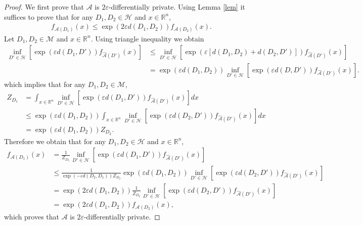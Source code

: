 \documentclass[12pt,a4paper]{article}
\numberwithin{equation}{section}
\numberwithin{equation}{section}
\renewcommand{\epsilon}{\varepsilon}
\newcommand{\1}{{\text{\Large $\mathfrak 1$}}}
\newcommand{\2}[1]{{\text{\Large $\mathfrak 1$}\!\left(#1\right)}}
\begin{document}
\begin{proof}
We first prove that $\mathcal{A}$ is $2\epsilon$-differentially private. Using Lemma \ref{lem} it suffices to prove that for any $D_1,D_2 \in \mathcal{H}$ and $x \in \mathbb{R}^n$,
 \begin{align*}
f_{\mathcal{A}(D_1)}(x) \leq \exp \left(2 \epsilon d(D_1,D_2)\right) f_{\mathcal{A}(D_2)}(x).
\end{align*}Let $D_1,D_2 \in \mathcal{M}$ and $x \in \mathbb{R}^n$. Using triangle inequality we obtain \begin{align*}\inf_{D' \in \mathcal{H}} \left[ \exp \left( \epsilon d(D_1,D')\right) f_{\hat{\mathcal{A}}(D')}(x) \right] & \leq \inf_{D' \in \mathcal{H}} \left[ \exp\left(\epsilon \left[d(D_1,D_2)+d(D_2,D')\right] \right) f_{\hat{\mathcal{A}}(D')}(x) \right]\\
&=\exp \left( \epsilon d(D_1,D_2)\right) \inf_{D' \in \mathcal{H}} \left[ \exp \left(\epsilon d(D,D')\right) f_{\hat{\mathcal{A}}(D')}(x) \right].
\end{align*}which implies that for any $D_1,D_2 \in \mathcal{M}$, 
\begin{align*}
Z_{D_1}&=\int_{x \in \mathbb{R}^n} \inf_{D' \in \mathcal{H}} \left[ \exp\left(\epsilon d(D_1,D')\right) f_{\hat{\mathcal{A}}(D')}(x) \right] dx \\
&\leq \exp\left(\epsilon d(D_1,D_2) \right)\int_{x \in \mathbb{R}^n} \inf_{D' \in \mathcal{H}} \left[ \exp \left( \epsilon d(D_2,D') \right) f_{\hat{\mathcal{A}}(D')}(x) \right] dx\\
&=\exp \left( \epsilon d(D_1,D_2) \right) Z_{D_2}. 
\end{align*}Therefore we obtain that for any $D_1,D_2 \in \mathcal{H}$ and $x \in \mathbb{R}^n$,
 \begin{align*}
f_{\mathcal{A}(D_1)}(x) &=\frac{1}{Z_{D_1}} \inf_{D' \in \mathcal{H}} \left[ \exp \left( \epsilon d(D_1,D') \right) f_{\hat{\mathcal{A}}(D')}(x) \right] \\
&\leq \frac{1}{\exp\left(-\epsilon d(D_2,D_1)\right)Z_{D_2}}\exp\left(\epsilon d(D_1,D_2)\right) \inf_{D' \in \mathcal{H}}  \left[ \exp \left( \epsilon d(D_2,D') \right) f_{\hat{\mathcal{A}}(D')}(x) \right] \\
&=\exp \left(2 \epsilon d(D_1,D_2)\right) \frac{1}{Z_{D_2}} \inf_{D' \in \mathcal{H}}  \left[ \exp \left( \epsilon d(D_2,D') \right) f_{\hat{\mathcal{A}}(D')}(x) \right]\\
&=\exp \left(2 \epsilon d(D_1,D_2)\right) f_{\mathcal{A}(D_2)}(x),
\end{align*}which proves that $\mathcal{A}$ is $2\epsilon$-differentially private. 


\end{proof}
\end{document}
